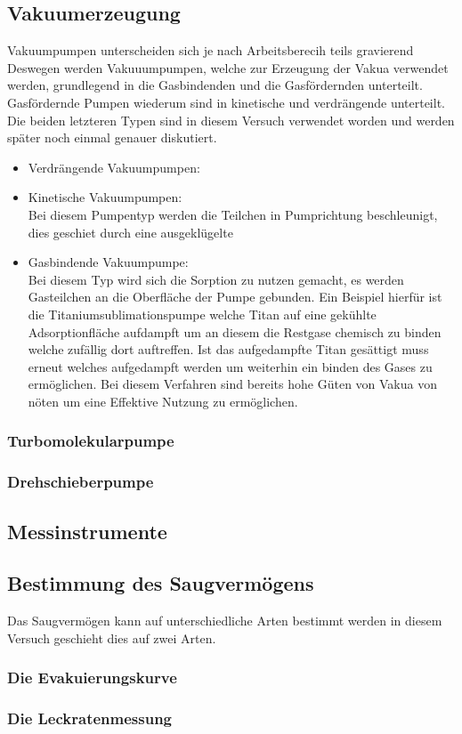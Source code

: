 \subsection{Vakuumerzeugung}
Vakuumpumpen unterscheiden sich je nach Arbeitsberecih teils gravierend 
Deswegen werden Vakuuumpumpen, welche zur Erzeugung der Vakua verwendet werden, grundlegend in die Gasbindenden und die Gasfördernden unterteilt. 
Gasfördernde Pumpen wiederum sind in kinetische und verdrängende unterteilt. Die beiden letzteren Typen sind in diesem Versuch verwendet worden 
und werden später noch einmal genauer diskutiert.
\begin{itemize}
    \item Verdrängende Vakuumpumpen:\\
    

    \item Kinetische Vakuumpumpen:\\
    Bei diesem Pumpentyp werden die Teilchen in Pumprichtung beschleunigt, dies geschiet durch eine ausgeklügelte 

    \item Gasbindende Vakuumpumpe:\\
    Bei diesem Typ wird sich die Sorption zu nutzen gemacht, es werden Gasteilchen an die Oberfläche der Pumpe gebunden. Ein Beispiel 
    hierfür ist die Titaniumsublimationspumpe welche Titan auf eine gekühlte Adsorptionfläche aufdampft um an diesem die Restgase chemisch 
    zu binden welche zufällig dort auftreffen. Ist das aufgedampfte Titan gesättigt muss erneut welches aufgedampft werden um weiterhin ein binden 
    des Gases zu ermöglichen. Bei diesem Verfahren sind bereits hohe Güten von Vakua von nöten um eine Effektive Nutzung zu ermöglichen.
\end{itemize}

\subsubsection{Turbomolekularpumpe}


\subsubsection{Drehschieberpumpe}

\subsection{Messinstrumente}

\subsection{Bestimmung des Saugvermögens}
Das Saugvermögen kann auf unterschiedliche Arten bestimmt werden in diesem Versuch geschieht dies auf zwei Arten.
\subsubsection{Die Evakuierungskurve}

\subsubsection{Die Leckratenmessung}

